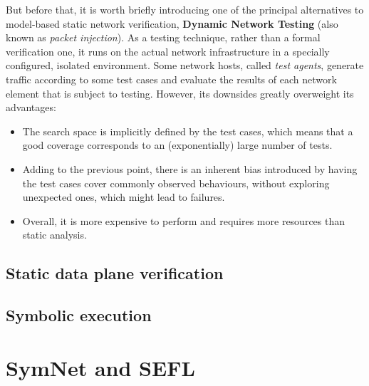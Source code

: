 But before that, it is worth briefly introducing one of the principal
alternatives to model-based static network verification, \textbf{Dynamic
Network Testing} (also known as \emph{packet injection}). As a testing
technique, rather than a formal verification one, it runs on the actual network
infrastructure in a specially configured, isolated environment.  Some network
hosts, called \emph{test agents}, generate traffic according to some test cases
and evaluate the results of each network element that is subject to testing.
However, its downsides greatly overweight its advantages:

\begin{itemize}
  \item The search space is implicitly defined by the test cases, which means
    that a good coverage corresponds to an (exponentially) large number of
    tests.
  \item Adding to the previous point, there is an inherent bias introduced by
    having the test cases cover commonly observed behaviours, without exploring
    unexpected ones, which might lead to failures.
  \item Overall, it is more expensive to perform and requires more resources
    than static analysis.
\end{itemize}

\subsection{Static data plane verification}


\subsection{Symbolic execution}\label{sub-sec:symb-exec}


\section{SymNet and SEFL}\label{sec:symnet-sefl}


